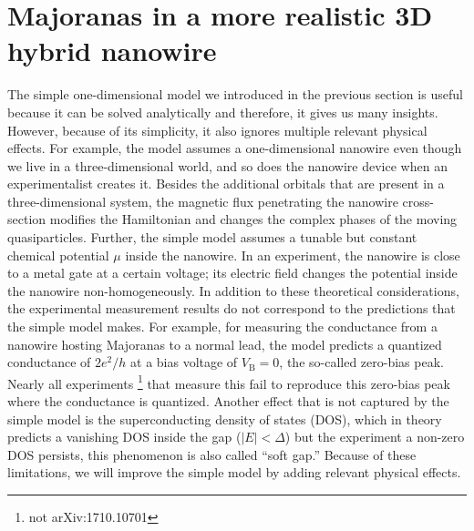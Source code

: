 \section{Majoranas in a more realistic 3D hybrid nanowire}\label{sec:realistic_nanowire}
The simple one-dimensional model we introduced in the previous section is useful because it can be solved analytically and therefore, it gives us many insights.
However, because of its simplicity, it also ignores multiple relevant physical effects.
For example, the model assumes a one-dimensional nanowire even though we live in a three-dimensional world, and so does the nanowire device when an experimentalist creates it.
Besides the additional orbitals that are present in a three-dimensional system, the magnetic flux penetrating the nanowire cross-section modifies the Hamiltonian and changes the complex phases of the moving quasiparticles.
Further, the simple model assumes a tunable but constant chemical potential $\mu$ inside the nanowire.
In an experiment, the nanowire is close to a metal gate at a certain voltage; its electric field changes the potential inside the nanowire non-homogeneously.
In addition to these theoretical considerations, the experimental measurement results do not correspond to the predictions that the simple model makes.
For example, for measuring the conductance from a nanowire hosting Majoranas to a normal lead, the model predicts a quantized conductance of $2 e^2/h$ at a bias voltage of $V_\textrm{B}=0$, the so-called zero-bias peak.
Nearly all experiments \footnote{not arXiv:1710.10701} that measure this fail to reproduce this zero-bias peak where the conductance is quantized.
Another effect that is not captured by the simple model is the superconducting density of states (DOS), which in theory predicts a vanishing DOS inside the gap ($|E|<\Delta$) but the experiment a non-zero DOS persists, this phenomenon is also called ``soft gap.''
Because of these limitations, we will improve the simple model by adding relevant physical effects.

